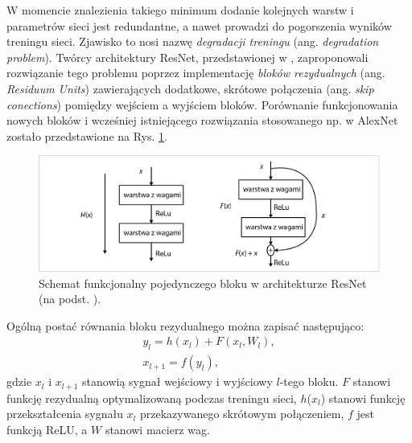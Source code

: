 W momencie znalezienia takiego minimum dodanie kolejnych warstw i parametrów sieci jest redundantne, a nawet prowadzi do pogorszenia wyników treningu sieci. Zjawisko to nosi nazwę \textit{degradacji treningu} (ang. \textit{degradation problem}). Twórcy architektury ResNet, przedstawionej w \cite{ResNet}, zaproponowali rozwiązanie tego problemu poprzez implementację \textit{bloków rezydualnych} (ang. \textit{Residuum Units}) zawierających dodatkowe, skrótowe połączenia (ang. \textit{skip conections}) pomiędzy wejściem a wyjściem bloków. Porównanie funkcjonowania nowych bloków i wcześniej istniejącego rozwiązania stosowanego np. w AlexNet zostało przedstawione na Rys. \ref{ResNetBlock}.
\begin{figure}[h!]
	\centering
	\includegraphics[width=1\textwidth]{figures/ResidualBlock.png}
	\caption{Schemat funkcjonalny pojedynczego bloku w architekturze ResNet (na podst. \cite{ResNet}).}
	\label{ResNetBlock}
\end{figure} 

Ogólną postać równania bloku rezydualnego można zapisać następująco:
\begin{equation}
\begin{split}
y_l = h(x_l) + F(x_l, W_l),\\
x_{l+1} = f(y_l),
\end{split}
\end{equation}
gdzie $x_l$ i $x_{l+1}$ stanowią sygnał wejściowy i wyjściowy $l$-tego bloku. $F$ stanowi funkcję rezydualną optymalizowaną podczas treningu sieci, $h$($x_l$) stanowi funkcję przekształcenia sygnału $x_l$ przekazywanego skrótowym połączeniem, $f$ jest funkcją ReLU, \linebreak a $W$ stanowi macierz wag.

